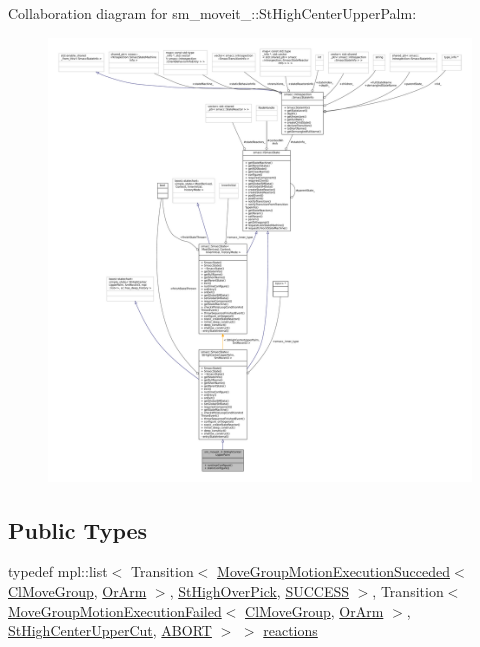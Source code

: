 Collaboration diagram for sm\+\_\+moveit\+\_\+:\+:St\+High\+Center\+Upper\+Palm\+:
\nopagebreak
\begin{figure}[H]
\begin{center}
\leavevmode
\includegraphics[width=350pt]{structsm__moveit__3_1_1StHighCenterUpperPalm__coll__graph}
\end{center}
\end{figure}
\subsection*{Public Types}
\begin{DoxyCompactItemize}
\item 
typedef mpl\+::list$<$ Transition$<$ \hyperlink{structmoveit__z__client_1_1MoveGroupMotionExecutionSucceded}{Move\+Group\+Motion\+Execution\+Succeded}$<$ \hyperlink{classmoveit__z__client_1_1ClMoveGroup}{Cl\+Move\+Group}, \hyperlink{classsm__moveit__3_1_1OrArm}{Or\+Arm} $>$, \hyperlink{structsm__moveit__3_1_1StHighOverPick}{St\+High\+Over\+Pick}, \hyperlink{classSUCCESS}{S\+U\+C\+C\+E\+SS} $>$, Transition$<$ \hyperlink{structmoveit__z__client_1_1MoveGroupMotionExecutionFailed}{Move\+Group\+Motion\+Execution\+Failed}$<$ \hyperlink{classmoveit__z__client_1_1ClMoveGroup}{Cl\+Move\+Group}, \hyperlink{classsm__moveit__3_1_1OrArm}{Or\+Arm} $>$, \hyperlink{structsm__moveit__3_1_1StHighCenterUpperCut}{St\+High\+Center\+Upper\+Cut}, \hyperlink{classABORT}{A\+B\+O\+RT} $>$ $>$ \hyperlink{structsm__moveit__3_1_1StHighCenterUpperPalm_aad95efec300751f5b6021f941c660dbe}{reactions}
\end{DoxyCompactItemize}
